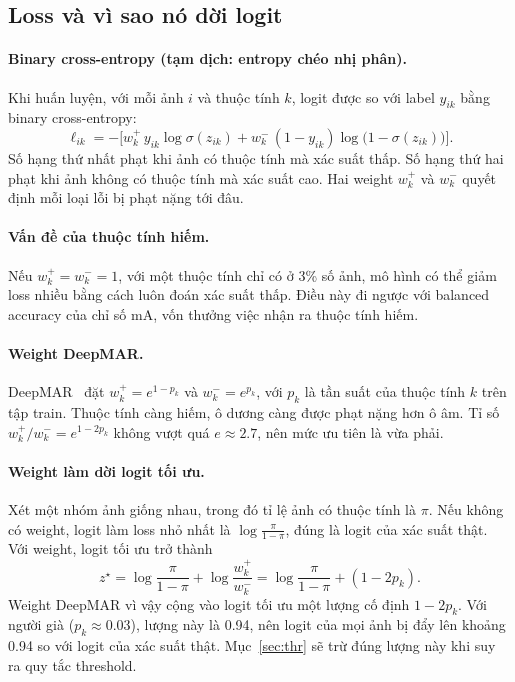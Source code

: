 \documentclass[11pt,a4paper]{article}
\begin{document}
\subsection{Loss và vì sao nó dời logit}
\label{sec:loss}

\paragraph{Binary cross-entropy (tạm dịch: entropy chéo nhị phân).} Khi huấn luyện, với mỗi ảnh $i$ và thuộc tính $k$, logit được so với label $y_{ik}$ bằng binary cross-entropy:
\begin{equation}
\ell_{ik} = -\Big[w^+_k\,y_{ik}\log\sigma(z_{ik}) + w^-_k\,(1-y_{ik})\log\big(1-\sigma(z_{ik})\big)\Big].
\end{equation}
Số hạng thứ nhất phạt khi ảnh có thuộc tính mà xác suất thấp. Số hạng thứ hai phạt khi ảnh không có thuộc tính mà xác suất cao. Hai weight $w^+_k$ và $w^-_k$ quyết định mỗi loại lỗi bị phạt nặng tới đâu.

\paragraph{Vấn đề của thuộc tính hiếm.} Nếu $w^+_k=w^-_k=1$, với một thuộc tính chỉ có ở 3\% số ảnh, mô hình có thể giảm loss nhiều bằng cách luôn đoán xác suất thấp. Điều này đi ngược với balanced accuracy của chỉ số mA, vốn thưởng việc nhận ra thuộc tính hiếm.

\paragraph{Weight DeepMAR.} DeepMAR~\cite{deepmar} đặt $w^+_k=e^{1-p_k}$ và $w^-_k=e^{p_k}$, với $p_k$ là tần suất của thuộc tính $k$ trên tập train. Thuộc tính càng hiếm, ô dương càng được phạt nặng hơn ô âm. Tỉ số $w^+_k/w^-_k=e^{1-2p_k}$ không vượt quá $e\approx2.7$, nên mức ưu tiên là vừa phải.

\paragraph{Weight làm dời logit tối ưu.} Xét một nhóm ảnh giống nhau, trong đó tỉ lệ ảnh có thuộc tính là $\pi$. Nếu không có weight, logit làm loss nhỏ nhất là $\log\frac{\pi}{1-\pi}$, đúng là logit của xác suất thật. Với weight, logit tối ưu trở thành
\begin{equation}
z^\star = \log\frac{\pi}{1-\pi} + \log\frac{w^+_k}{w^-_k} = \log\frac{\pi}{1-\pi} + (1-2p_k).
\end{equation}
Weight DeepMAR vì vậy cộng vào logit tối ưu một lượng cố định $1-2p_k$. Với người già ($p_k\approx0.03$), lượng này là 0.94, nên logit của mọi ảnh bị đẩy lên khoảng 0.94 so với logit của xác suất thật. Mục~\ref{sec:thr} sẽ trừ đúng lượng này khi suy ra quy tắc threshold.
\end{document}

